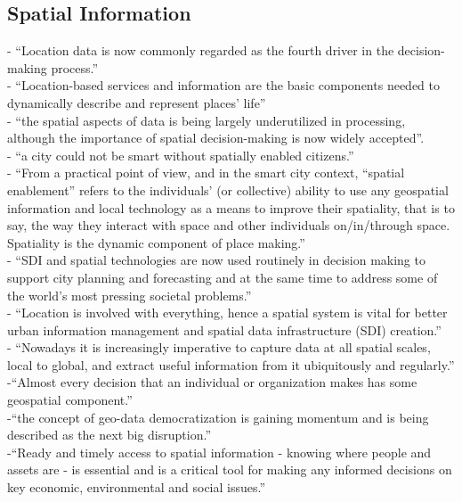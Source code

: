 \subsection{Spatial Information}
- {\color{orange} “Location data is now commonly regarded as the fourth driver in the decision-making process.”} \cite{Roche2012}\\
- {\color{orange}  “Location-based services and information are the basic components needed to dynamically describe and represent places’ life” } \cite{Roche2012}\\
-{\color{orange} “the spatial aspects of data is being largely underutilized in processing, although the importance of spatial decision-making is now widely accepted”.}\cite{Bhattacharya2018}\\
- {\color{orange} “a city could not be smart without spatially enabled citizens.”} \cite{Roche2012}\\
- {\color{orange} “From a practical point of view, and in the smart city context, “spatial enablement” refers to the individuals’ (or collective) ability to use any geospatial information and local technology as a means to improve their spatiality, that is to say, the way they interact with space and other individuals on/in/through space. Spatiality is the dynamic component of place making.”} \cite{Roche2012}\\
- {\color{orange} “SDI and spatial technologies are now used routinely in decision making to support city planning and forecasting and at the same time to address some of the world’s most pressing societal problems.”}\\
-{\color{orange} “Location is involved with everything, hence a spatial system is vital for better urban information management and spatial data infrastructure (SDI) creation.” } \cite{Bhattacharya2018}\\
-{\color{orange} “Nowadays it is increasingly imperative to capture data at all spatial scales, local to global, and extract useful information from it ubiquitously and regularly.”}\cite{Bhattacharya2018}\\
-{\color{orange}“Almost every decision that an individual or organization makes has some geospatial component.”}\cite{Bhattacharya2018}\\
-{\color{orange}“the concept of geo-data democratization is gaining momentum and is being described as the next big disruption.”}\cite{Bhattacharya2018}\\
-{\color{orange}“Ready and timely access to spatial information - knowing where people and assets are - is essential and is a critical tool for making any informed decisions on key economic, environmental and social issues.”}\cite{Rajabifard2009}\\
